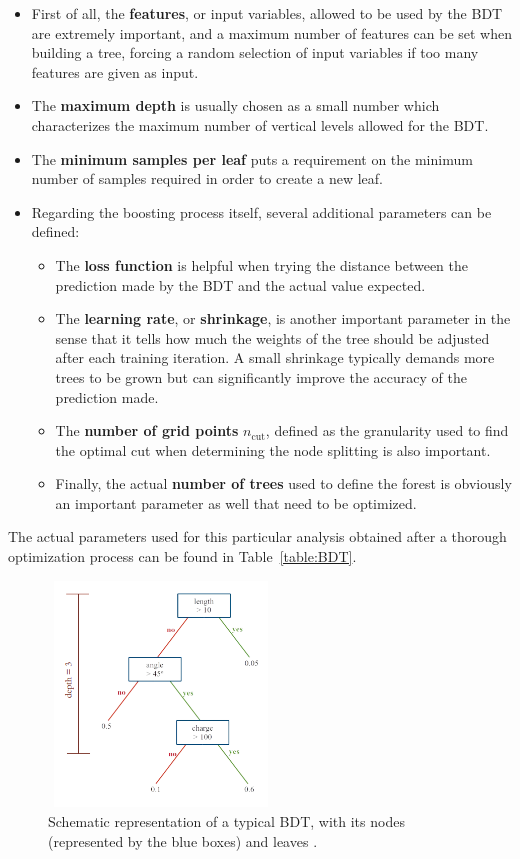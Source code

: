 \documentclass[a4paper, 10pt, openright]{report}
\begin{document}
\begin{itemize}
\item First of all, the \textbf{features}, or input variables, allowed to be used by the \ac{BDT} are extremely important, and a maximum number of features can be set when building a tree, forcing a random selection of input variables if too many features are given as input.
\item The \textbf{maximum depth} is usually chosen as a small number which characterizes the maximum number of vertical levels allowed for the \ac{BDT}.
\item The \textbf{minimum samples per leaf} puts a requirement on the minimum number of samples required in order to create a new leaf.
\item Regarding the boosting process itself, several additional parameters can be defined:

\begin{itemize}
\item The \textbf{loss function} is helpful when trying the distance between the prediction made by the \ac{BDT} and the actual value expected.
\item The \textbf{learning rate}, or \textbf{shrinkage}, is another important parameter in the sense that it tells how much the weights of the tree should be adjusted after each training iteration. A small shrinkage typically demands more trees to be grown but can significantly improve the accuracy of the prediction made.
\item The \textbf{number of grid points} $n_\text{cut}$, defined as the granularity used to find the optimal cut when determining the node splitting is also important.
\item Finally, the actual \textbf{number of trees} used to define the forest is obviously an important parameter as well that need to be optimized.
\end{itemize}

\end{itemize}

The actual parameters used for this particular analysis obtained after a thorough optimization process can be found in Table~\ref{table:BDT}.

\begin{figure}[htbp]
\centering
\includegraphics[width=6cm, height=6cm]{figs/BDT.png}
\caption{Schematic representation of a typical \ac{BDT}, with its nodes (represented by the blue boxes) and leaves \cite{FNALBDT}.}
\label{fig:BDT}
\end{figure}
\end{document}
